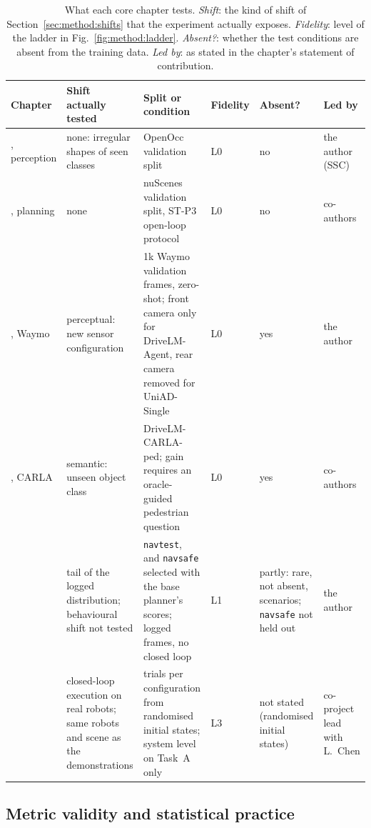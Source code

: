 \begin{table}[tbp]
  \centering
  \caption[What each core chapter tests]{What each core chapter tests. \emph{Shift}: the kind of shift of Section~\ref{sec:method:shifts} that the experiment actually exposes. \emph{Fidelity}: level of the ladder in Fig.~\ref{fig:method:ladder}. \emph{Absent?}: whether the test conditions are absent from the training data. \emph{Led by}: as stated in the chapter's statement of contribution.}
  \label{tab:method:tests}
  \footnotesize
  \renewcommand{\arraystretch}{1.15}
  \begin{tabularx}{\textwidth}{@{}>{\raggedright\arraybackslash}p{1.75cm} >{\raggedright\arraybackslash}X >{\raggedright\arraybackslash}X >{\centering\arraybackslash}p{0.9cm} >{\raggedright\arraybackslash}X >{\raggedright\arraybackslash}p{1.75cm}@{}}
    \toprule
    Chapter & Shift actually tested & Split or condition & Fidelity & Absent? & Led by \\
    \midrule
    4, perception & none: irregular shapes of seen classes & OpenOcc validation split & L0 & no & the author (SSC) \\
    4, planning & none & nuScenes validation split, ST-P3 open-loop protocol & L0 & no & co-authors \\
    5, Waymo & perceptual: new sensor configuration & 1k Waymo validation frames, zero-shot; front camera only for DriveLM-Agent, rear camera removed for UniAD-Single & L0 & yes & the author \\
    5, CARLA & semantic: unseen object class & DriveLM-CARLA-ped; gain requires an oracle-guided pedestrian question & L0 & yes & co-authors \\
    6 & tail of the logged distribution; behavioural shift not tested & \texttt{navtest}, and \texttt{navsafe} selected with the base planner's scores; logged frames, no closed loop & L1 & partly: rare, not absent, scenarios; \texttt{navsafe} not held out & the author \\
    7 & closed-loop execution on real robots; same robots and scene as the demonstrations & 30 trials per configuration from randomised initial states; system level on Task~A only & L3 & not stated (randomised initial states) & co-project lead with L.~Chen \\
    \bottomrule
  \end{tabularx}
\end{table}

\subsection{Metric validity and statistical practice}

